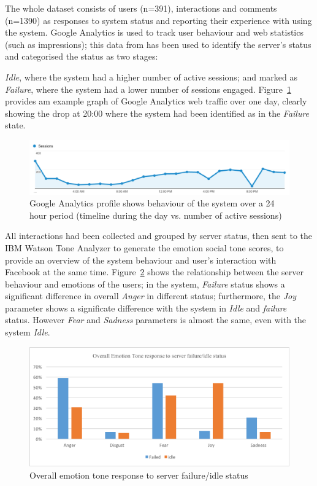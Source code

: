 \documentclass[graybox]{svmult}
\begin{document}
The whole dataset consists of users (n=391), interactions and comments
(n=1390) as responses to system status and reporting their experience
with using the system. Google Analytics is used to track user behaviour
and web statistics (such as impressions); this data from has been used
to identify the server's status and categorised the status as two
stages: {\emph{Idle}, where the system had a higher number of active
sessions; and marked as {\emph{Failure}}, where the system had a lower
number of sessions engaged. Figure~\ref{fig:googleanalytics} provides
am example graph of Google Analytics web traffic over one day, clearly
showing the drop at 20:00 where the system had been identified as in
the {\emph{Failure}} state.

\begin{figure}[!ht]
\centering
\includegraphics[width=\columnwidth]{images/googleanalytics}
\caption{Google Analytics profile shows behaviour of the system over a
  24 hour period (timeline during the day vs. number of active sessions)}
\label{fig:googleanalytics} 
\end{figure}

All interactions had been collected and grouped by server status, then
sent to the IBM Watson Tone Analyzer to generate the emotion social
tone scores, to provide an overview of the system behaviour and user’s
interaction with Facebook at the same
time. Figure~\ref{fig:emotiontone} shows the relationship between the
server behaviour and emotions of the users; in the system,
{\emph{Failure}} status shows a significant difference in overall
{\emph{Anger}} in different status; furthermore, the {\emph{Joy}}
parameter shows a significate difference with the system in
{\emph{Idle}} and {\emph{failure}} status. However {\emph{Fear}} and
{\emph{Sadness}} parameters is almost the same, even with the system
{\emph{Idle}}.

\begin{figure}[!ht]
\centering
\includegraphics[width=\columnwidth]{images/emotiontone}
\caption{Overall emotion tone response to server failure/idle status}
\label{fig:emotiontone} 
\end{figure}

}
\end{document}
